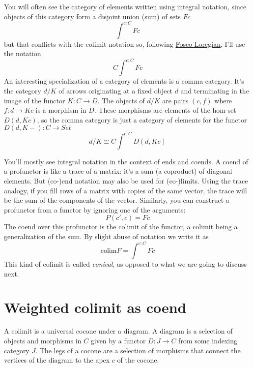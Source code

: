\documentclass[11pt]{amsart}
\begin{document}
You will often see the category of elements written using integral notation, since objects of this category form a disjoint union (sum) of sets $F c$
\[\int^{c \colon C} F c\]
but that conflicts with the colimit notation so, following \href{https://arxiv.org/abs/1501.02503}{Fosco Loregian}, I'll use the notation
\[C\int^{c \colon C} F c\]
An interesting specialization of a category of elements is a comma category. It's the category $d/K$ of arrows originating at a fixed object $d$ and terminating in the image of the functor $K \colon C \to D$. The objects of $d/K$ are pairs $(c, f)$ where $f \colon d \to K c$ is a morphism in $D$. These morphisms are elements of the hom-set $D(d, K c)$, so the comma category is just a category of elements for the functor $D(d, K-) \colon C \to Set$
\[d/K \cong C\int^{c\colon C} D(d, K c)\]

You'll mostly see integral notation in the context of ends and coends. A coend of a profunctor is like a trace of a matrix: it's a sum (a coproduct) of diagonal elements. But (co-)end notation may also be used for (co-)limits. Using the trace analogy, if you fill rows of a matrix with copies of the same vector, the trace will be the sum of the components of the vector. Similarly, you can construct a profunctor from a functor by ignoring one of the arguments:
\[ P(c', c) = F c\]
The coend over this profunctor is the colimit of the functor, a colimit being a generalization of the sum. By slight abuse of notation we write it as
\[ \mbox{colim} F = \int^{c \colon C} F c \]
This kind of colimit is called \emph{conical}, as opposed to what we are going to discuss next.
\section{Weighted colimit as coend}
A colimit is a universal cocone under a diagram. A diagram is a selection of objects and morphisms in $C$ given by a functor $D \colon J \to C$ from some indexing category $J$. The legs of a cocone are a selection of morphisms that connect the vertices of the diagram to the apex $c$ of the cocone. 
\end{document}
